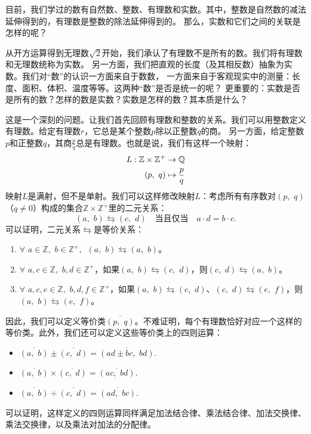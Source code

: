 \documentclass[12pt,UTF8]{ctexbook}
\begin{document}
目前，我们学过的数有自然数、整数、有理数和实数。其中，整数是自然数的减法延伸得到的，有理数是整数的除法延伸得到的。
那么，实数和它们之间的关联是怎样的呢？

从开方运算得到无理数$\sqrt{2}$开始，我们承认了有理数不是所有的数。我们将有理数和无理数统称为实数。
另一方面，我们把直观的长度（及其相反数）抽象为实数。我们对“数”的认识一方面来自于数数，
一方面来自于客观现实中的测量：长度、面积、体积、温度等等。这两种“数”是否是统一的呢？
更重要的：实数是否是所有的数？怎样的数是实数？实数是怎样的数？其本质是什么？

这是一个深刻的问题。让我们首先回顾有理数和整数的关系。我们可以用整数定义有理数。给定有理数$r$，它总是某个整数$p$除以正整数$q$的商。
另一方面，给定整数$p$和正整数$q$，其商$\frac{p}{q}$总是有理数。也就是说，我们有这样一个映射：
\begin{align}
    L: \mathbb{Z} \times \mathbb{Z}^+ &\rightarrow \mathbb{Q} \notag \\
    (p, \,\, q) &\mapsto \frac{p}{q} \notag
\end{align}
映射$L$是满射，但不是单射。我们可以这样修改映射$L$：考虑所有有序数对$(p, \,\, q)$（$q\neq 0$）构成的集合$\mathbb{Z} \times \mathbb{Z}^+$里的二元关系：
$$ (a,\,\, b) \leftrightarrows (c, \,\, d)\quad \mbox{当且仅当} \quad a\cdot d = b \cdot c.$$
可以证明，二元关系$\leftrightarrows$是等价关系：
\begin{enumerate}
    \item $\forall \,\, a\in \mathbb{Z}, \,\, b\in\mathbb{Z}^+, \,\,\, (a,\,\, b) \leftrightarrows (a, \,\, b)$。
    \item $\forall \,\, a,c\in \mathbb{Z}, \,\, b,d\in\mathbb{Z}^+$，如果$(a,\,\, b) \leftrightarrows (c, \,\, d)$，则$ (c, \,\, d)\leftrightarrows (a,\,\, b)$。
    \item $\forall \,\, a,c,e\in \mathbb{Z}, \,\, b,d,f\in\mathbb{Z}^+$，如果$(a,\,\, b) \leftrightarrows (c, \,\, d)$、$ (c, \,\, d)\leftrightarrows (e,\,\, f)$，则$(a,\,\, b) \leftrightarrows (e,\,\, f)$。
\end{enumerate}
因此，我们可以定义等价类$\overline{(p,\,\, q)}$。不难证明，每个有理数恰好对应一个这样的等价类。此外，我们还可以定义这些等价类上的四则运算：
\begin{itemize}
    \item $\overline{(a,\,\, b)} \pm \overline{(c, \,\, d)} = \overline{(ad \pm bc, \,\, bd)}.$
    \item $\overline{(a,\,\, b)} \times \overline{(c, \,\, d)} = \overline{(ac, \,\, bd)}.$
    \item $\overline{(a,\,\, b)} \div \overline{(c, \,\, d)} = \overline{(ad, \,\, bc)}.$
\end{itemize}
可以证明，这样定义的四则运算同样满足加法结合律、乘法结合律、加法交换律、乘法交换律，以及乘法对加法的分配律。
\end{document}
